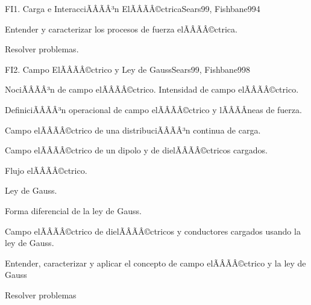 \begin{sumilla}
\begin{unit}{FI1. Carga e InteracciÃÂÃÂ³n ElÃÂÃÂ©ctrica}{Sears99, Fishbane99}{4}
   \begin{objetivos}
         \item  Entender y caracterizar los procesos de fuerza elÃÂÃÂ©ctrica.
         \item  Resolver problemas.
   \end{objetivos}
\end{unit}

\begin{unit}{FI2. Campo ElÃÂÃÂ©ctrico y Ley de Gauss}{Sears99, Fishbane99}{8}
   \begin{topicos}
         \item  NociÃÂÃÂ³n de campo elÃÂÃÂ©ctrico.  Intensidad de campo elÃÂÃÂ©ctrico.
	 \item  DefiniciÃÂÃÂ³n operacional de campo elÃÂÃÂ©ctrico y lÃÂÃÂ­neas de fuerza.
         \item  Campo elÃÂÃÂ©ctrico de una distribuciÃÂÃÂ³n continua de carga.
	 \item  Campo elÃÂÃÂ©ctrico de un dipolo y de dielÃÂÃÂ©ctricos cargados.
         \item  Flujo elÃÂÃÂ©ctrico.
	 \item  Ley de Gauss.
         \item  Forma diferencial de la ley de Gauss.
	 \item  Campo elÃÂÃÂ©ctrico de dielÃÂÃÂ©ctricos y conductores cargados usando la ley de Gauss.
   \end{topicos}

   \begin{objetivos}
         \item  Entender, caracterizar y aplicar el concepto de campo elÃÂÃÂ©ctrico y la ley de Gauss
         \item  Resolver problemas
   \end{objetivos}
\end{unit}


\end{sumilla}
